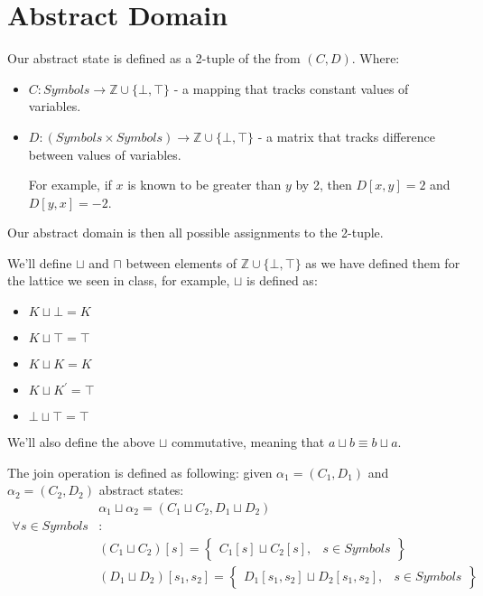 \section*{Abstract Domain}
Our abstract state is defined as a 2-tuple of the from $(C,D)$. Where:
\begin{itemize}
	\item $C: Symbols \rightarrow \mathbb{Z}\cup \{\bot, \top\}$ - a mapping that tracks constant values of variables.
	\item $D: (Symbols \times Symbols )\rightarrow \mathbb{Z}\cup \{\bot, \top\}$ - a matrix that tracks difference between values of variables.
	
	For example, if $x$ is known to be greater than $y$ by 2, then $D[x,y] = 2$ and $D[y,x] = -2$.

\end{itemize}
Our abstract domain is then all possible assignments to the 2-tuple.

We'll define $\sqcup$ and $\sqcap$ between elements of $\mathbb{Z}\cup \{\bot, \top\}$ as we have defined them for the lattice we seen in class, for example, $\sqcup$ is defined as:
\begin{itemize}
	\item $K \sqcup \bot = K$
	\item $K \sqcup \top = \top$
	\item $K \sqcup K = K$
	\item $K \sqcup K^\prime = \top$
	\item $\bot \sqcup \top = \top$
\end{itemize}
We'll also define the above $\sqcup$ commutative, meaning that $a\sqcup b \equiv b \sqcup a$.

The join operation is defined as following: given $\alpha_1=(C_1, D_1)$ and $\alpha_2=(C_2,D_2)$ abstract states:
\begin{align*}
&\alpha_1\sqcup\alpha_2=(C_1\sqcup C_2, D_1 \sqcup D_2) \\
\forall s \in Symbols&:  \\
&(C_1\sqcup C_2)[s] = \left.
	\begin{cases}
		C_1[s]\sqcup C_2[s], & s \in Symbols
	\end{cases}
\right\} \\
&(D_1\sqcup D_2)[s_1, s_2] = \left.
	\begin{cases}
		D_1[s_1, s_2]\sqcup D_2[s_1, s_2], & s \in Symbols
	\end{cases}
\right\}
\end{align*}
